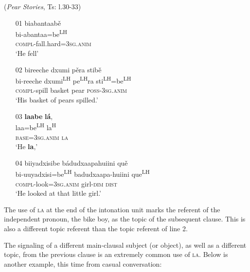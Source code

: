\ea\label{markedIPR2}  (\textit{Pear Stories}, Ts: l.30-33)
\begin{itemize}
\item[01]
\glll biabantaab\v{e}  \\
bi-abantaa=be\textsuperscript{LH}  \\
\textsc{compl}-fall.hard=3\textsc{sg.anim}  \\
\glt `He fell'


\item[02]
\glll bireeche dxumi p\v{e}ra stib\v{e}  \\
bi-reeche dxumi\textsuperscript{LH} pe\textsuperscript{LH}ra sti\textsuperscript{LH}=be\textsuperscript{LH}  \\
\textsc{compl}-spill basket pear \textsc{poss}-3\textsc{sg.anim}  \\
\glt `His basket of pears spilled.'


\item[03]
\glll \textbf{laabe} \textbf{l\'{a}},  \\
laa=be\textsuperscript{LH} la\textsuperscript{H}  \\
\textsc{base}=3\textsc{sg.anim} \textsc{la}  \\
\glt `He \textbf{la},'


\item[04]
\glll biiyadxisibe b\'{a}dudxaapahuiini qu\v{e}  \\
bi-uuyadxisi=be\textsuperscript{LH} badudxaapa-huiini que\textsuperscript{LH}  \\
\textsc{compl}-look=3\textsc{sg.anim} girl-\textsc{dim} \textsc{dist}  \\
\glt `He looked at that little girl.' 

\end{itemize}
\z
The use of \textsc{la} at the end of the intonation unit marks the referent of the independent pronoun, the bike boy, as the topic of the subsequent clause. This is also a different topic referent than the topic referent of line 2.

The signaling of a different main-clausal subject (or object), as well as a different topic, from the previous clause is an extremely common use of \textsc{la}.  Below is another example, this time from casual conversation:

